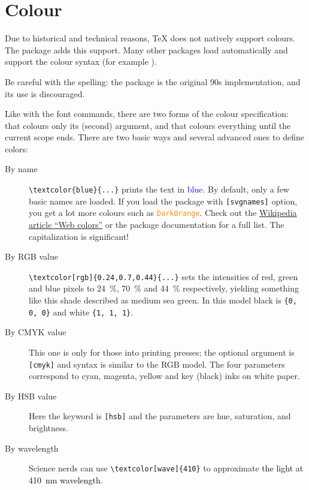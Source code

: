 %
%
%
\section{Colour}\label{sec:colour}

Due to historical and technical reasons, \TeX{} does not natively support colours.
The  package adds this support.
Many other packages load  automatically
and support the colour syntax (for example ).

\begin{gotcha}
Be careful with the spelling: the  package is the original 90s implementation,
and its use is discouraged.
\end{gotcha}

Like with the font commands, there are two forms of the colour specification:
 that colours only its (second) argument,
and  that colours everything until the current scope ends.
There are two basic ways and several advanced ones to define colors:

\begin{description}
\item[By name] \verb|\textcolor{blue}{...}| prints the text in \textcolor{blue}{blue}.
    By default, only a few basic names are loaded.
    If you load the package with \verb|[svgnames]| option,
    you get a lot more colours such as \textcolor{DarkOrange}{\texttt{DarkOrange}}.
    Check out the \href{https://en.wikipedia.org/wiki/Web_colors}{Wikipedia article ``Web colors''}
    or the package documentation for a full list.
    The capitalization is significant!
\item[By RGB value] \verb|\textcolor[rgb]{0.24,0.7,0.44}{...}|
    sets the intensities of red, green and blue pixels to 24~\%, 70~\% and 44~\% respectively,
    yielding something like \textcolor[rgb]{0.24,0.7,0.44}{this shade described as medium sea green}.
    In this model black is \verb|{0, 0, 0}| and white \verb|{1, 1, 1}|.
\item[By CMYK value] This one is only for those into printing presses;
    the optional argument is \verb|[cmyk]| and syntax is similar to the RGB model.
    The four parameters correspond to cyan, magenta, yellow and key (black) inks on white paper.
\item[By HSB value] Here the keyword is \verb|[hsb]|
    and the parameters are hue, saturation, and brightness.
\item[By wavelength]
    Science nerds can use \verb|\textcolor[wave]{410}|
    to approximate \textcolor[wave]{410}{the light at 410~nm wavelength}.
\end{description}


